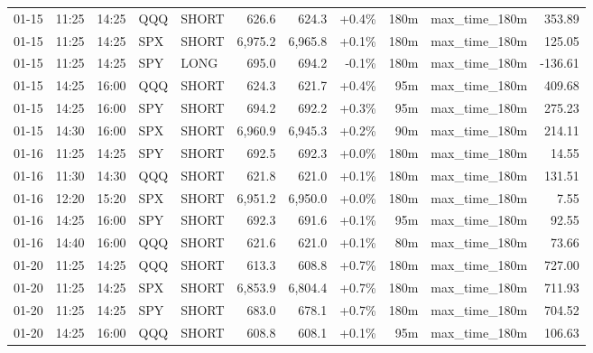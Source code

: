 \documentclass[11pt,a4paper,twoside]{article}
\begin{document}
\begin{center}
\begin{longtable}{>{\color{txtmain}}l l l l l r r r r >{\color{txtmain}}l r}
01-15 & 11:25 & 14:25 & QQQ & SHORT & 626.6 & 624.3 & \textcolor{wingreen}{+0.4\%} & 180m & max\_time\_180m & \textcolor{wingreen}{353.89} \\
01-15 & 11:25 & 14:25 & SPX & SHORT & 6,975.2 & 6,965.8 & \textcolor{wingreen}{+0.1\%} & 180m & max\_time\_180m & \textcolor{wingreen}{125.05} \\
01-15 & 11:25 & 14:25 & SPY & LONG & 695.0 & 694.2 & \textcolor{lossred}{-0.1\%} & 180m & max\_time\_180m & \textcolor{lossred}{-136.61} \\
01-15 & 14:25 & 16:00 & QQQ & SHORT & 624.3 & 621.7 & \textcolor{wingreen}{+0.4\%} & 95m & max\_time\_180m & \textcolor{wingreen}{409.68} \\
01-15 & 14:25 & 16:00 & SPY & SHORT & 694.2 & 692.2 & \textcolor{wingreen}{+0.3\%} & 95m & max\_time\_180m & \textcolor{wingreen}{275.23} \\
01-15 & 14:30 & 16:00 & SPX & SHORT & 6,960.9 & 6,945.3 & \textcolor{wingreen}{+0.2\%} & 90m & max\_time\_180m & \textcolor{wingreen}{214.11} \\
01-16 & 11:25 & 14:25 & SPY & SHORT & 692.5 & 692.3 & \textcolor{wingreen}{+0.0\%} & 180m & max\_time\_180m & \textcolor{wingreen}{14.55} \\
01-16 & 11:30 & 14:30 & QQQ & SHORT & 621.8 & 621.0 & \textcolor{wingreen}{+0.1\%} & 180m & max\_time\_180m & \textcolor{wingreen}{131.51} \\
01-16 & 12:20 & 15:20 & SPX & SHORT & 6,951.2 & 6,950.0 & \textcolor{wingreen}{+0.0\%} & 180m & max\_time\_180m & \textcolor{wingreen}{7.55} \\
01-16 & 14:25 & 16:00 & SPY & SHORT & 692.3 & 691.6 & \textcolor{wingreen}{+0.1\%} & 95m & max\_time\_180m & \textcolor{wingreen}{92.55} \\
01-16 & 14:40 & 16:00 & QQQ & SHORT & 621.6 & 621.0 & \textcolor{wingreen}{+0.1\%} & 80m & max\_time\_180m & \textcolor{wingreen}{73.66} \\
01-20 & 11:25 & 14:25 & QQQ & SHORT & 613.3 & 608.8 & \textcolor{wingreen}{+0.7\%} & 180m & max\_time\_180m & \textcolor{wingreen}{727.00} \\
01-20 & 11:25 & 14:25 & SPX & SHORT & 6,853.9 & 6,804.4 & \textcolor{wingreen}{+0.7\%} & 180m & max\_time\_180m & \textcolor{wingreen}{711.93} \\
01-20 & 11:25 & 14:25 & SPY & SHORT & 683.0 & 678.1 & \textcolor{wingreen}{+0.7\%} & 180m & max\_time\_180m & \textcolor{wingreen}{704.52} \\
01-20 & 14:25 & 16:00 & QQQ & SHORT & 608.8 & 608.1 & \textcolor{wingreen}{+0.1\%} & 95m & max\_time\_180m & \textcolor{wingreen}{106.63} \\

\end{longtable}
\end{center}
\end{document}
